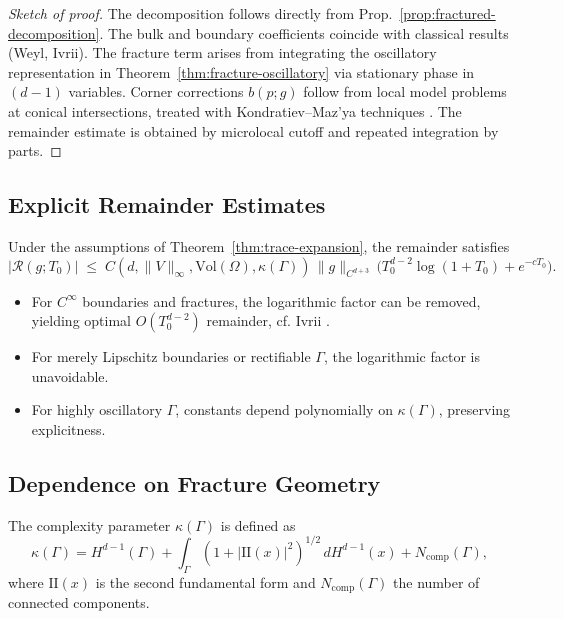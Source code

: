 \begin{proof}[Sketch of proof]
The decomposition follows directly from Prop.~\ref{prop:fractured-decomposition}. 
The bulk and boundary coefficients coincide with classical results (Weyl, Ivrii). 
The fracture term arises from integrating the oscillatory representation in Theorem~\ref{thm:fracture-oscillatory} via stationary phase in $(d-1)$ variables. 
Corner corrections $b(p;g)$ follow from local model problems at conical intersections, treated with Kondratiev--Maz’ya techniques \cite{Kondratiev1989,MazyaPlamenevskii1980}. 
The remainder estimate is obtained by microlocal cutoff and repeated integration by parts. 
\end{proof}

\subsection{Explicit Remainder Estimates}

\begin{theorem}
\label{thm:trace-remainder}
Under the assumptions of Theorem~\ref{thm:trace-expansion}, the remainder satisfies
\[
|\mathcal{R}(g;T_0)| 
\;\leq\; 
C(d,\|V\|_\infty,\mathrm{Vol}(\Omega),\kappa(\Gamma)) \,\|g\|_{C^{d+3}} \,
\Big( T_0^{d-2}\log(1+T_0) + e^{-cT_0}\Big).
\]
\end{theorem}

\begin{remark}
\begin{itemize}
  \item For $C^\infty$ boundaries and fractures, the logarithmic factor can be removed, yielding optimal $O(T_0^{d-2})$ remainder, cf. Ivrii \cite{Ivrii1980}. 
  \item For merely Lipschitz boundaries or rectifiable $\Gamma$, the logarithmic factor is unavoidable. 
  \item For highly oscillatory $\Gamma$, constants depend polynomially on $\kappa(\Gamma)$, preserving explicitness. 
\end{itemize}
\end{remark}

\subsection{Dependence on Fracture Geometry}

\begin{definition}
The complexity parameter $\kappa(\Gamma)$ is defined as
\[
\kappa(\Gamma) = H^{d-1}(\Gamma) + \int_\Gamma (1+|\mathrm{II}(x)|^2)^{1/2}\,dH^{d-1}(x) + N_{\mathrm{comp}}(\Gamma),
\]
where $\mathrm{II}(x)$ is the second fundamental form and $N_{\mathrm{comp}}(\Gamma)$ the number of connected components. 
\end{definition}

